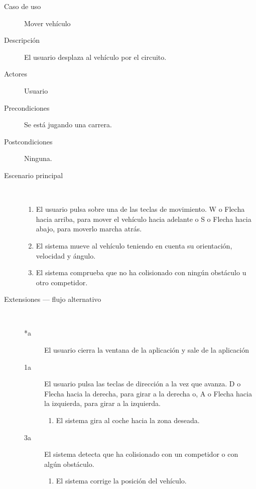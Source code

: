 \begin{description}
    \item[Caso de uso] Mover vehículo
    \item[Descripción] El usuario desplaza al vehículo por el circuito.
    \item[Actores] Usuario
    \item[Precondiciones] Se está jugando una carrera.
    \item[Postcondiciones] Ninguna.
    \item[Escenario principal] $\quad$
        \begin{enumerate}
            \item El usuario pulsa sobre una de las teclas de movimiento. W o Flecha hacia arriba, para mover el vehículo
            hacia adelante o S o Flecha hacia abajo, para moverlo marcha atrás.
            \item El sistema mueve al vehículo teniendo en cuenta su orientación, velocidad y ángulo.
            \item El sistema comprueba que no ha colisionado con ningún obstáculo u otro competidor.
        \end{enumerate}
    \item[Extensiones --- flujo alternativo] $\quad$
        \begin{description}
            \item[*a ] El usuario cierra la ventana de la aplicación y sale de la aplicación
            \item[1a ] El usuario pulsa las teclas de dirección a la vez que avanza. D o Flecha hacia la derecha, para girar
            a la derecha o, A o Flecha hacia la izquierda, para girar a la izquierda.
                \begin{enumerate}
                    \item El sistema gira al coche hacia la zona deseada.
                \end{enumerate}
            \item[3a ] El sistema detecta que ha colisionado con un competidor
            o con algún obstáculo.
                \begin{enumerate}
                    \item El sistema corrige la posición del vehículo.
                \end{enumerate}
        \end{description}
\end{description}

